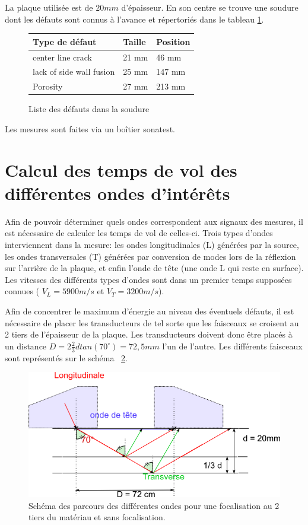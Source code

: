\documentclass[twoside]{article}
\begin{document}
\begin{multicols}{2}
La plaque utilisée est de $20 mm$ d'épaisseur. En son centre se trouve une soudure dont les défauts sont connus à l'avance et répertoriés dans le tableau \ref{tab1}.
\bigskip

\begin{figure}[H]
\begin{tabular}{l|l|l}
Type de défaut & Taille & Position \\ \hline 
center line crack & 21 mm& 46 mm\\
lack of side wall fusion & 25 mm& 147 mm\\
Porosity & 27 mm& 213 mm
\end{tabular}
\caption{\label{tab1} Liste des défauts dans la soudure}
\end{figure}

Les mesures sont faites via un boîtier sonatest.


\section{Calcul des temps de vol des différentes ondes d’intérêts}
Afin de pouvoir déterminer quels ondes correspondent aux signaux des mesures, il est nécessaire de calculer les temps de vol de celles-ci. Trois types d'ondes interviennent dans la mesure: les ondes longitudinales (L) générées par la source, les ondes transversales (T) générées par conversion de modes lors de la réflexion sur l'arrière de la plaque, et enfin l'onde de tête (une onde L qui reste en surface). Les vitesses des différents types d'ondes sont dans un premier temps supposées connues ( $V_L = 5900 m/s$ et $V_T = 3200 m/s$). 

Afin de concentrer le maximum d'énergie au niveau des éventuels défauts, il est nécessaire de placer les transducteurs de tel sorte que les faisceaux se croisent au 2 tiers de l'épaisseur de la plaque. Les transducteurs doivent donc être placés à un distance $D = 2 \frac{2}{3}d tan(70^\circ)=72,5 mm $ l'un de l'autre. Les différents faisceaux sont représentés sur le schéma ~\ref{schema2}.

\bigskip
\begin{figure}[H]
\centering
\includegraphics[scale=0.5]{./images/faiseaux.png}
\caption{\label{schema2} Schéma des parcours des différentes ondes pour une focalisation au 2 tiers du matériau et sans focalisation.}
\end{figure}


\end{multicols}
\end{document}
